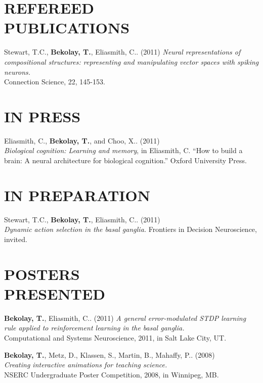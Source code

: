 \documentclass[line,margin]{res}
\begin{document}
\begin{resume}
\clearpage

\section{REFEREED \\PUBLICATIONS}
  Stewart, T.C., \textbf{Bekolay, T.}, Eliasmith, C.. (2011)
    {\sl Neural representations of compositional structures: representing and manipulating vector spaces with spiking neurons.} \\
    Connection Science, 22, 145-153.

\section{IN PRESS}
  Eliasmith, C., \textbf{Bekolay, T.}, and Choo, X.. (2011) \\
   {\sl Biological cognition: Learning and memory}, in Eliasmith, C. ``How to build a brain: A neural architecture for biological cognition.'' Oxford University Press.

\section{IN PREPARATION}
  Stewart, T.C., \textbf{Bekolay, T.}, Eliasmith, C.. (2011) \\
    {\sl Dynamic action selection in the basal ganglia.}
    Frontiers in Decision Neuroscience, invited.



\section{POSTERS \\PRESENTED}
  \textbf{Bekolay, T.}, Eliasmith, C.. (2011)
    {\sl A general error-modulated STDP learning rule applied to reinforcement learning in the basal ganglia.} \\
    Computational and Systems Neuroscience, 2011, in Salt Lake City, UT.
  
  \textbf{Bekolay, T.}, Metz, D., Klassen, S., Martin, B., Mahaffy, P.. (2008) \\
    {\sl Creating interactive animations for teaching science.} \\
    NSERC Undergraduate Poster Competition, 2008, in Winnipeg, MB.


\end{resume}
\end{document}
